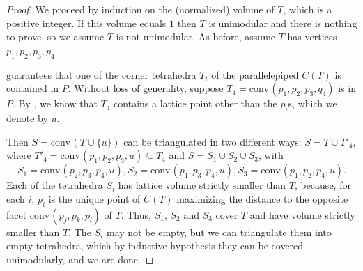 \documentclass{amsart}
\theoremstyle{plain}
\theoremstyle{definition}
\newcommand{\Vol}{\operatorname{Vol}}
\newcommand{\conv}{\ensuremath{\mathrm{conv}}\hspace{1pt}}
\newcommand{\giulia}[1]{\todo[size=\tiny,color=blue!30]{#1 \\ \hfill --- G.}}
\begin{document}
\begin{proof}
We proceed by induction on the (normalized) volume of $T$, which is a positive integer. If this volume equals $1$ then $T$ is unimodular and there is nothing to prove, so we assume $T$ is not unimodular. As before, assume $T$ has vertices $p_1, p_2, p_3, p_4$.

 guarantees that one of the corner tetrahedra $T_i$ of the parallelepiped $C(T)$ is contained in $P$. Without loss of generality, suppose $T_4 = \conv(p_1, p_2, p_3,q_4)$ is in $P$. By , we know that $T_4$ contains a lattice point other than the $p_i$s, which we denote by $u$. 

Then $S=\conv(T\cup \{u\})$ can be triangulated in two different ways: $S=T \cup T'_4$, where $T'_4 = \conv(p_1, p_2, p_3, u) \subseteq T_4$ and $S= S_1 \cup S_2 \cup S_3$, with
\[
S_1= \conv(p_2,p_3,p_4, u),
S_2=\conv(p_1,p_3,p_4, u),
S_3=\conv(p_1,p_2,p_4, u).
\]
Each of the tetrahedra $S_i$ has lattice volume strictly smaller than $T$, because, for each $i$, $p_i$ is the unique point of $C(T)$ maximizing the distance to the opposite facet $\conv(p_j,p_k,p_l)$ of $T$. Thus, $S_1$, $S_2$ and $S_3$ cover $T$ and have volume strictly smaller than $T$. The $S_i$ may not be empty, but we can triangulate them into empty tetrahedra, which by inductive hypothesis they can be covered unimodularly, and we are done.

%
\end{proof}
\end{document}
